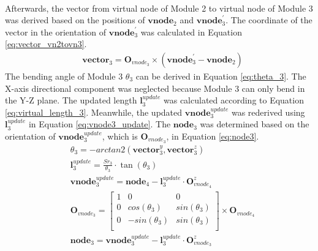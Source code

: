 \begin{itemize}
\begin{align}
        \label{eq:vnode3_origin}
    \end{align}
    Afterwards, the vector from virtual node of Module 2 to virtual node of Module 3 was derived based on the 
    positions of $\textbf{vnode}_{2}$ and $\textbf{vnode}_{3}^{'}$. The coordinate of the vector in the orientation 
    of $\textbf{vnode}_{3}^{'}$ was calculated in Equation \ref{eq:vector_vn2tovn3}. 
    \vspace{-5mm}
    \begin{align}
        &\textbf{vector}_{3} = \textbf{O}_{vnode_3} \times (\textbf{vnode}_{3}^{'} - \textbf{vnode}_{2}) 
        \label{eq:vector_vn2tovn3} 
    \end{align}
    The bending angle of Module 3 $\theta_3$ can be derived in Equation \ref{eq:theta_3}. The X-axis directional 
    component was neglected because Module 3 can only bend in the Y-Z plane. The updated length $\textbf{l}_{3}^{update}$ 
    was calculated according to Equation \ref{eq:virtual_length_3}. Meanwhile, the updated 
    $\textbf{vnode}_{3}^{update}$ was rederived using $\textbf{l}_{3}^{update}$ in Equation \ref{eq:vnode3_update}. 
    The $\textbf{node}_3$ was determined based on the orientation of $\textbf{vnode}_{3}^{update}$, 
    which is $\textbf{O}_{vnode_3}$, in Equation \ref{eq:node3}.
    \vspace{-5mm}
    \begin{align}
        &\theta_3 = -arctan2(\textbf{vector}_{3}^{y},\textbf{vector}_{3}^{z})
        \label{eq:theta_3} \\
        &\textbf{l}_{3}^{update} = \frac{Sr_3}{\theta_3}\cdot \tan(\theta_3)
        \label{eq:virtual_length_3} \\
        &\textbf{vnode}_{3}^{update} = \textbf{node}_{4} - \textbf{l}_{3}^{update} \cdot \textbf{O}_{vnode_4}^{z}
        \label{eq:vnode3_update} \\
        &\textbf{O}_{vnode_3} =     
        \begin{bmatrix}
            1 & 0 & 0 \\
            0 & cos(\theta_3) & sin(\theta_3) \\
            0 & -sin(\theta_3) & sin(\theta_3) \\
        \end{bmatrix}  
        \times \textbf{O}_{vnode_4}
        \label{eq:orientation_vnode3} \\
        &\textbf{node}_3 = \textbf{vnode}_{3}^{update} - \textbf{l}_{3}^{update} \cdot \textbf{O}_{vnode_3}^{z}
        \label{eq:node3} 

\end{align}
\end{itemize}
